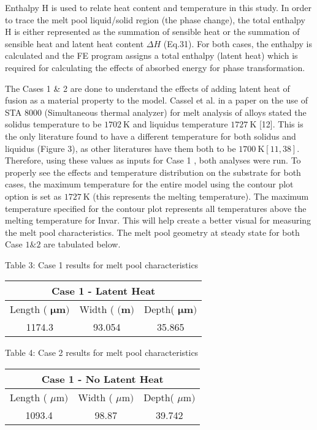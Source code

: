 \documentclass[10pt]{article}
\begin{document}
Enthalpy $\mathrm{H}$ is used to relate heat content and temperature in this study. In order to trace the melt pool liquid/solid region (the phase change), the total enthalpy $\mathrm{H}$ is either represented as the summation of sensible heat or the summation of sensible heat and latent heat content $\Delta H$ (Eq.31). For both cases, the enthalpy is calculated and the FE program assigns a total enthalpy (latent heat) which is required for calculating the effects of absorbed energy for phase transformation.

The Cases 1 \& 2 are done to understand the effects of adding latent heat of fusion as a material property to the model. Cassel et al. in a paper on the use of STA 8000 (Simultaneous thermal analyzer) for melt analysis of alloys stated the solidus temperature to be $1702 \mathrm{~K}$ and liquidus temperature $1727 \mathrm{~K}$ [12]. This is the only literature found to have a different temperature for both solidus and liquidus (Figure 3), as other literatures have them both to be $1700 \mathrm{~K}[11,38]$. Therefore, using these values as inputs for Case 1 , both analyses were run. To properly see the effects and temperature distribution on the substrate for both cases, the maximum temperature for the entire model using the contour plot option is set as $1727 \mathrm{~K}$ (this represents the melting temperature). The maximum temperature specified for the contour plot represents all temperatures above the melting temperature for Invar. This will help create a better visual for measuring the melt pool characteristics. The melt pool geometry at steady state for both Case $1 \& 2$ are tabulated below.

Table 3: Case 1 results for melt pool characteristics

\begin{center}
\begin{tabular}{c|c|c}
\hline
\multicolumn{3}{c}{Case 1 - Latent Heat} \\
\hline
Length ( $\mathbf{\mu m})$ & Width ( $\mathbf{( m})$ & Depth( $\boldsymbol{\mu m})$ \\
\hline
1174.3 & 93.054 & 35.865 \\
\hline
\end{tabular}
\end{center}

Table 4: Case 2 results for melt pool characteristics

\begin{center}
\begin{tabular}{|c|c|c|}
\hline
\multicolumn{3}{|c|}{Case 1 - No Latent Heat} \\
\hline
Length ( $\mu \mathrm{m})$ & Width ( $\mu \mathrm{m})$ & Depth( $\mu \mathrm{m})$ \\
\hline
1093.4 & 98.87 & 39.742 \\
\hline
\end{tabular}
\end{center}
\end{document}
